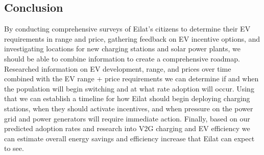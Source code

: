\documentclass{article}                         %
\begin{document}
\subsection{Conclusion}
By conducting comprehensive surveys of Eilat's citizens to determine their EV requirements in range and price, gathering feedback on EV incentive options, and investigating locations for new charging stations and solar power plants, we should be able to combine information to create a comprehensive roadmap. Researched information on EV development, range, and prices over time combined with the EV range + price requirements we can determine if and when the population will begin switching and at what rate adoption will occur. Using that we can establish a timeline for how Eilat should begin deploying charging stations, when they should activate incentives, and when pressure on the power grid and power generators will require immediate action. Finally, based on our predicted adoption rates and research into V2G charging and EV efficiency we can estimate overall energy savings and efficiency increase that Eilat can expect to see.

\newpage


\end{document}
